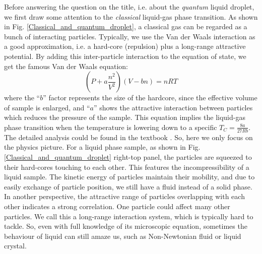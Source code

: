 Before answering the question on the title, i.e. about the \textit{quantum} liquid droplet, we first draw some attention to the \textit{classical} liquid-gas phase transition. As shown in Fig. \ref{Classical_and_quantum_droplet}, a classical gas can be regarded as a bunch of interacting particles. Typically, we use the Van der Waals interaction as a good approximation, i.e. a hard-core (repulsion) plus a long-range attractive potential. By adding this inter-particle interaction to the equation of state, we get the famous Van der Waals equation:
\begin{equation}
\label{VdW equation}
(P+a\frac{n^2}{V^2})(V-bn)=nRT
\end{equation}
where the ``\(b\)'' factor represents the size of the hardcore, since the effective volume of sample is enlarged, and ``\(a\)'' shows the attractive interaction between particles which reduces the pressure of the sample. This equation implies the liquid-gas phase transition when the temperature is lowering down to a specific \(T_C=\frac{8a}{27Rb}\). The detailed analysis could be found in the textbook \cite{Cowan2005}. So, here we only focus on the physics picture. For a liquid phase sample, as shown in Fig. \ref{Classical_and_quantum_droplet} right-top panel, the particles are squeezed to their hard-cores touching to each other. This features the incompressibility of a liquid sample. The kinetic energy of particles maintain their mobility, and due to easily exchange of particle position, we still have a fluid instead of a solid phase. In another perspective, the attractive range of particles overlapping with each other indicates a strong correlation. One particle could affect many other particles. We call this a long-range interaction system, which is typically hard to tackle. So, even with full knowledge of its microscopic equation, sometimes the behaviour of liquid can still amaze us, such as Non-Newtonian fluid or liquid crystal.

